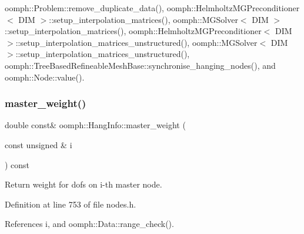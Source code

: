 oomph\+::\+Problem\+::remove\+\_\+duplicate\+\_\+data(), oomph\+::\+Helmholtz\+M\+G\+Preconditioner$<$ D\+I\+M $>$\+::setup\+\_\+interpolation\+\_\+matrices(), oomph\+::\+M\+G\+Solver$<$ D\+I\+M $>$\+::setup\+\_\+interpolation\+\_\+matrices(), oomph\+::\+Helmholtz\+M\+G\+Preconditioner$<$ D\+I\+M $>$\+::setup\+\_\+interpolation\+\_\+matrices\+\_\+unstructured(), oomph\+::\+M\+G\+Solver$<$ D\+I\+M $>$\+::setup\+\_\+interpolation\+\_\+matrices\+\_\+unstructured(), oomph\+::\+Tree\+Based\+Refineable\+Mesh\+Base\+::synchronise\+\_\+hanging\+\_\+nodes(), and oomph\+::\+Node\+::value().

\mbox{\label{classoomph_1_1HangInfo_a348a41fa20beb782d42f7a2275a4397a}} 
\subsubsection{\texorpdfstring{master\+\_\+weight()}{master\_weight()}}
{\footnotesize\ttfamily double const\& oomph\+::\+Hang\+Info\+::master\+\_\+weight (\begin{DoxyParamCaption}\item[{const unsigned \&}]{i }\end{DoxyParamCaption}) const\hspace{0.3cm}{\ttfamily [inline]}}



Return weight for dofs on i-\/th master node. 



Definition at line 753 of file nodes.\+h.



References i, and oomph\+::\+Data\+::range\+\_\+check().



